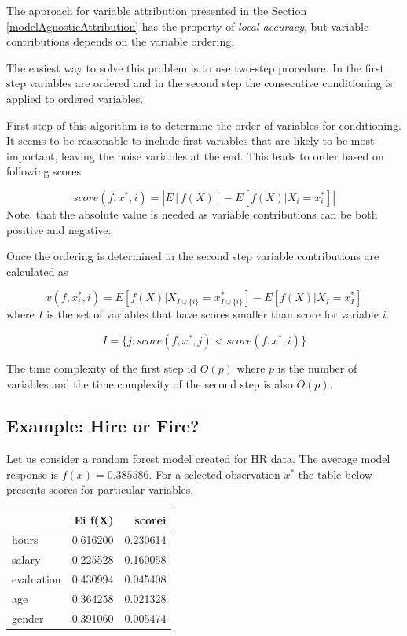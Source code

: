 \documentclass[12pt,]{krantz}
\theoremstyle{definition}
\theoremstyle{definition}
\theoremstyle{definition}
\theoremstyle{remark}
\begin{document}
The approach for variable attribution presented in the Section
\ref{modelAgnosticAttribution} has the property of \emph{local
accuracy}, but variable contributions depends on the variable ordering.

The easiest way to solve this problem is to use two-step procedure. In
the first step variables are ordered and in the second step the
consecutive conditioning is applied to ordered variables.

First step of this algorithm is to determine the order of variables for
conditioning. It seems to be reasonable to include first variables that
are likely to be most important, leaving the noise variables at the end.
This leads to order based on following scores

\[
score(f, x^*, i) = \left| E [f(X)] - E [f(X)|X_i = x^*_i] \right|
\] Note, that the absolute value is needed as variable contributions can
be both positive and negative.

Once the ordering is determined in the second step variable
contributions are calculated as

\[
v(f, x^*_i, i) = E [f(X) | X_{I \cup \{i\}} = x_{I \cup \{i\}}^*] - E [f(X) | X_{I} = x_{I}^*] 
\] where \(I\) is the set of variables that have scores smaller than
score for variable \(i\).

\[
I = \{j: score(f, x^*, j) < score(f, x^*, i)\}
\]

The time complexity of the first step id \(O(p)\) where \(p\) is the
number of variables and the time complexity of the second step is also
\(O(p)\).

\hypertarget{example-hire-or-fire}{%
\subsection{Example: Hire or Fire?}\label{example-hire-or-fire}}

Let us consider a random forest model created for HR data. The average
model response is \(\bar f(x) = 0.385586\). For a selected observation
\(x^*\) the table below presents scores for particular variables.

\begin{longtable}[]{@{}lrr@{}}
\toprule
& Ei f(X) & scorei\tabularnewline
\midrule
\endhead
hours & 0.616200 & 0.230614\tabularnewline
salary & 0.225528 & 0.160058\tabularnewline
evaluation & 0.430994 & 0.045408\tabularnewline
age & 0.364258 & 0.021328\tabularnewline
gender & 0.391060 & 0.005474\tabularnewline
\bottomrule
\end{longtable}
\end{document}
